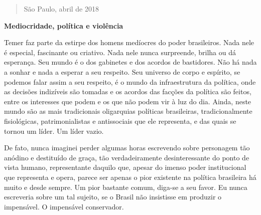 \begin{quote}
São Paulo, abril de 2018
\end{quote}

\textbf{Mediocridade, política e violência}

Temer faz parte da estirpe dos homens medíocres do poder brasileiros.
Nada nele é especial, fascinante ou criativo. Nada nele nunca
surpreende, brilha ou dá esperança. Seu mundo é o dos gabinetes e dos
acordos de bastidores. Não há nada a sonhar e nada a esperar a seu
respeito. Seu universo de corpo e espírito, se podemos falar assim a seu
respeito, é o mundo da infraestrutura da política, onde as decisões
indizíveis são tomadas e os acordos das facções da política são feitos,
entre os interesses que podem e os que não podem vir à luz do dia.
Ainda, neste mundo são as mais tradicionais oligarquias políticas
brasileiras, tradicionalmente fisiológicas, patrimonialistas e
antissociais que ele representa, e das quais se tornou um líder. Um
líder vazio.

De fato, nunca imaginei perder algumas horas escrevendo sobre personagem
tão anódino e destituído de graça, tão verdadeiramente desinteressante
do ponto de vista humano, representante daquilo que, apesar do imenso
poder institucional que representa e opera, parece ser apenas o pior
existente na política brasileira há muito e desde sempre. Um pior
bastante comum, diga-se a seu favor. Eu nunca escreveria sobre um tal
sujeito, se o Brasil não insistisse em produzir o impensável. O
impensável conservador.

